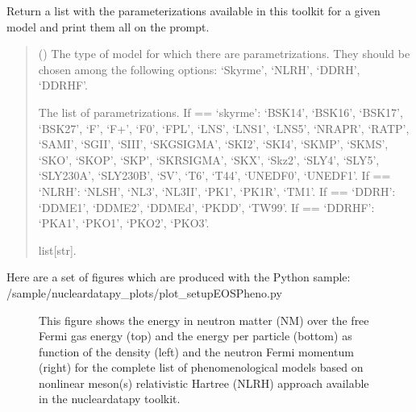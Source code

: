 \documentclass[letterpaper,10pt,english]{sphinxmanual}
\begin{document}
\begin{fulllineitems}
\label{\detokenize{source/api/setup_eos_pheno:nucleardatapy.setup_eos_pheno.eos_pheno_params}}
\pysigstartsignatures
\pysiglinewithargsret
{}
{}
{}
\pysigstopsignatures
\sphinxAtStartPar
Return a list with the parameterizations available in
this toolkit for a given model and print them all on the prompt.
\begin{quote}\begin{description}
\sphinxAtStartPar
{} () \textendash{} The type of model for which there are parametrizations.     They should be chosen among the following options: ‘Skyrme’, ‘NLRH’,     ‘DDRH’, ‘DDRHF’.

\sphinxAtStartPar
The list of parametrizations.     If  == ‘skyrme’: ‘BSK14’,     ‘BSK16’, ‘BSK17’, ‘BSK27’, ‘F\sphinxhyphen{}’, ‘F+’, ‘F0’, ‘FPL’, ‘LNS’, ‘LNS1’, ‘LNS5’,     ‘NRAPR’, ‘RATP’, ‘SAMI’, ‘SGII’, ‘SIII’, ‘SKGSIGMA’, ‘SKI2’, ‘SKI4’, ‘SKMP’,     ‘SKMS’, ‘SKO’, ‘SKOP’, ‘SKP’, ‘SKRSIGMA’, ‘SKX’, ‘Skz2’, ‘SLY4’, ‘SLY5’,     ‘SLY230A’, ‘SLY230B’, ‘SV’, ‘T6’, ‘T44’, ‘UNEDF0’, ‘UNEDF1’.     If  == ‘NLRH’: ‘NL\sphinxhyphen{}SH’, ‘NL3’, ‘NL3II’, ‘PK1’, ‘PK1R’, ‘TM1’.     If  == ‘DDRH’: ‘DDME1’, ‘DDME2’, ‘DDMEd’, ‘PKDD’, ‘TW99’.     If  == ‘DDRHF’: ‘PKA1’, ‘PKO1’, ‘PKO2’, ‘PKO3’.

\sphinxAtStartPar
list{[}str{]}.

\end{description}\end{quote}

\end{fulllineitems}


\sphinxAtStartPar
Here are a set of figures which are produced with the Python sample: /sample/nucleardatapy\_plots/plot\_setupEOSPheno.py

\begin{figure}[htbp]
\centering
\capstart

\noindent{}
\caption{This figure shows the energy in neutron matter (NM) over the free Fermi gas energy (top) and the energy per particle (bottom) as function of the density (left) and the neutron Fermi momentum (right) for the complete list of phenomenological models based on non\sphinxhyphen{}linear meson(s) relativistic Hartree (NLRH) approach available in the nucleardatapy toolkit.}\label{\detokenize{source/api/setup_eos_pheno:id1}}\end{figure}
\end{document}

